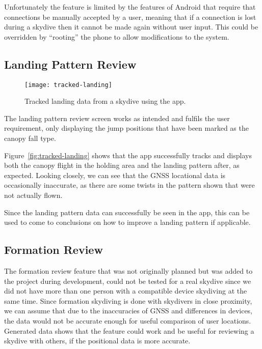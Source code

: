 Unfortunately the feature is limited by the features of Android that require that connections be manually accepted by a user, meaning that if a connection is lost during a skydive then it cannot be made again without user input. This could be overridden by ``rooting'' the phone to allow modifications to the system.

\subsection{Landing Pattern Review}
\begin{wrapfigure}[17]{r}{0.34\textwidth}
  \vspace{-1.5cm}
  \centering
  \texttt{[image: tracked-landing]}
  \caption{Tracked landing data from a skydive using the app.}\label{fig:tracked-landing}
\end{wrapfigure}

The landing pattern review screen works as intended and fulfils the user requirement, only displaying the jump positions that have been marked as the canopy fall type.

Figure~\vref{fig:tracked-landing} shows that the app successfully tracks and displays both the canopy flight in the holding area and the landing pattern after, as expected. Looking closely, we can see that the GNSS locational data is occasionally inaccurate, as there are some twists in the pattern shown that were not actually flown.

Since the landing pattern data can successfully be seen in the app, this can be used to come to conclusions on how to improve a landing pattern if applicable.

\subsection{Formation Review}
The formation review feature that was not originally planned but was added to the project during development, could not be tested for a real skydive since we did not have more than one person with a compatible device skydiving at the same time.
Since formation skydiving is done with skydivers in close proximity, we can assume that due to the inaccuracies of GNSS and differences in devices, the data would not be accurate enough for useful comparison of user locations.
Generated data shows that the feature could work and be useful for reviewing a skydive with others, if the positional data is more accurate.

